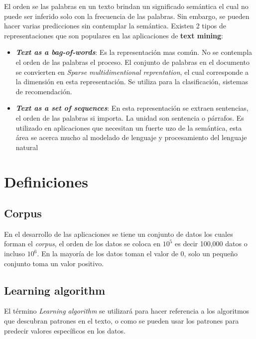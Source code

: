 El orden se las palabras en un texto brindan un significado semántica el cual no puede ser inferido  solo con la frecuencia de las palabras. Sin embargo, se pueden hacer varias predicciones sin contemplar la semántica. Existen 2 tipos de representaciones que son populares en las aplicaciones de \textbf{text mining}:

\begin{itemize}
	
	\item \textbf{\textit{Text as a bag-of-words}}: Es la representación mas común. No se contempla el orden de las palabras el proceso. El conjunto de palabras en el documento se convierten en \textit{Sparse multidimentional reprentation}, el cual corresponde a la dimensión en esta representación. Se utiliza para la clasificación, sistemas de recomendación.

	\item \textbf{\textit{Text as a set of sequences}}: En esta representación se extraen sentencias, el orden de las palabras si importa. La unidad son sentencia o párrafos. Es utilizado en aplicaciones que necesitan un fuerte uzo de la semántica, esta área se acerca mucho al modelado de lenguaje y procesamiento del lenguaje natural

\end{itemize}


\section{Definiciones}

\subsection{Corpus}

En el desarrollo de las aplicaciones se tiene un conjunto de datos los cuales forman el \textit{corpus}, el orden de los datos se coloca en $10^5$ es decir 100,000 datos o incluso $10^6$. En la mayoría de los datos toman el valor de 0, solo un pequeño conjunto toma un valor positivo.

\subsection{Learning algorithm}

El término \textit{Learning algorithm} se utilizará para hacer referencia a los algoritmos que descubran patrones en el texto, o como se pueden usar los patrones para predecir valores específicos en los datos.


